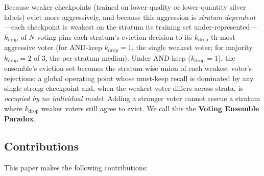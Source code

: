 Because weaker checkpoints (trained on lower-quality or lower-quantity silver
labels) evict more aggressively, and because this aggression is
\emph{stratum-dependent}---each checkpoint is weakest on the stratum its
training set under-represented---$k_{\mathrm{drop}}$-of-$N$ voting pins each
stratum's eviction decision to its $k_{\mathrm{drop}}$-th most aggressive
voter (for AND-keep $k_{\mathrm{drop}}{=}1$, the single weakest voter; for
majority $k_{\mathrm{drop}}{=}2$ of $3$, the per-stratum median). Under
AND-keep ($k_{\mathrm{drop}}{=}1$), the ensemble's eviction set becomes the
stratum-wise union of each weakest voter's rejections: a global operating
point whose must-keep recall is dominated by any single strong checkpoint and,
when the weakest voter differs across strata, is \emph{occupied by no
individual model}. Adding a stronger voter cannot rescue a stratum where $k_{\mathrm{drop}}$
weaker voters still agree to evict. We call this the \textbf{Voting Ensemble
Paradox}.

\subsection{Contributions}

This paper makes the following contributions:

